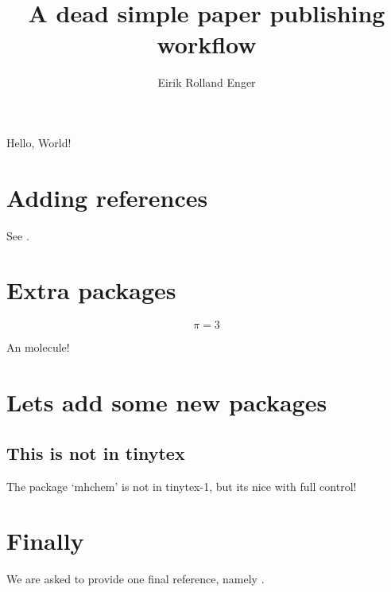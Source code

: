 \documentclass{article}
\author{Eirik Rolland Enger}
\title{A dead simple paper publishing workflow}
\begin{document}
\maketitle

Hello, World!

\section{Adding references}

See \cite{enger2025:paper1}.

\section{Extra packages}

\begin{equation}
  \pi = 3
  \label{eq:first-equation}
\end{equation}

An  molecule!

\section{Lets add some new packages}

\subsection{This is not in tinytex}

The package `mhchem' is not in tinytex-1, but its nice with full control!

\section{Finally}

We are asked to provide one final reference, namely \cite{enger2025:paper2}.



\end{document}
